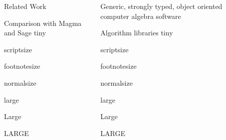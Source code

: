 \documentclass[final]{beamer}
\begin{document}
\begin{frame}{}
\begin{columns}[t]
\begin{column}{.3\linewidth}
\begin{block}{\large Related Work}
\par
  \end{block}
  \hfill
  \begin{block}{\large Comparison with Magma and Sage}
      \centering
      {\tiny tiny}\par
      {\scriptsize scriptsize}\par
      {\footnotesize footnotesize}\par
      {\normalsize normalsize}\par
      {\large large}\par
      {\Large Large}\par
      {\LARGE LARGE}\par
  \end{block}

\end{column}

\begin{column}{.3\linewidth}
 
  \begin{block}{\large Generic, strongly typed, object oriented computer algebra software}
      \centering
\par
  \end{block}
  \hfill
  \begin{block}{\large Algorithm libraries}
      \centering
      {\tiny tiny}\par
      {\scriptsize scriptsize}\par
      {\footnotesize footnotesize}\par
      {\normalsize normalsize}\par
      {\large large}\par
      {\Large Large}\par
      {\LARGE LARGE}\par
  \end{block}

\end{column}

\begin{column}{.3\linewidth}
 

\end{column}
\end{columns}
\end{frame}
\end{document}
